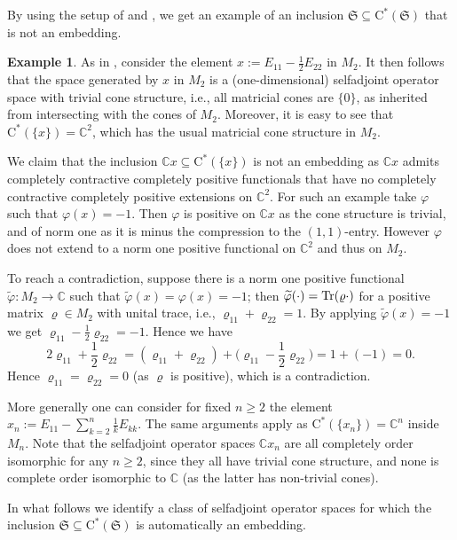 \documentclass[11pt, draft]{amsart}
\numberwithin{equation}{section}
\theoremstyle{plain}
\theoremstyle{definition}
\newtheorem{example}[theorem]{Example}
\theoremstyle{remark}
\newcommand\vphi{\varphi}
\newcommand{\bC}{\mathbb{C}}
\newcommand{\fS}{{\mathfrak{S}}}
\newcommand{\ca}{\mathrm{C}^*}
\newcommand{\wt}{\widetilde}
\begin{document}
By using the setup of \cite[Example 2.14]{KKM23} and \cite[Example 4.1]{Rus23}, we get an example of an inclusion $\fS \subseteq \ca(\fS)$ that is not an embedding.

\begin{example} \label{E:not incl}
As in \cite[Example 2.14]{KKM23}, consider the element $x := E_{11} - \frac{1}{2}E_{22}$ in $M_2$.
It then follows that the space generated by $x$ in $M_2$ is a (one-dimensional) selfadjoint operator space with trivial cone structure, i.e., all matricial cones are $\{0\}$, as inherited from intersecting with the cones of $M_2$.
Moreover, it is easy to see that $\ca(\{x\}) = \bC^2$, which has the usual matricial cone structure in $M_2$.

We claim that the inclusion $\bC x \subseteq \ca(\{x\})$ is not an embedding as $\bC x$ admits completely contractive completely positive functionals that have no completely contractive completely positive extensions on $\bC^2$.
For such an example take $\vphi$ such that $\vphi(x) = -1$.
Then $\vphi$ is positive on $\bC x$ as the cone structure is trivial, and of norm one as it is minus the compression to the $(1,1)$-entry.
However $\vphi$ does not extend to a norm one positive functional on $\bC^2$ and thus on $M_2$.

To reach a contradiction, suppose there is a norm one positive functional $\wt{\vphi} \colon M_2 \to \bC$ such that $\wt{\vphi}(x) = \vphi(x) = -1$; then $\wt{\vphi}(\cdot) = {\rm Tr}(\varrho \cdot)$ for a positive matrix $\varrho \in M_2$ with unital trace, i.e., $\varrho_{11} + \varrho_{22} = 1$.
By applying $\wt{\vphi}(x) = -1$ we get $\varrho_{11} - \frac{1}{2}\varrho_{22} = -1$.
Hence we have
\[
2\varrho_{11} + \frac{1}{2}\varrho_{22} = \left(\varrho_{11} + \varrho_{22}\right) + \bigg(\varrho_{11} - \frac{1}{2}\varrho_{22}\bigg) = 1+(-1)= 0.
\]
Hence $\varrho_{11} = \varrho_{22} = 0$ (as $\varrho$ is positive), which is a contradiction.

More generally one can consider for fixed $n \geq 2$ the element $x_n:= E_{11} - \sum_{k=2}^n \frac{1}{k} E_{kk}$.
The same arguments apply as $\ca(\{x_n\}) = \bC^n$ inside $M_n$.
Note that the selfadjoint operator spaces $\bC x_n$ are all completely order isomorphic for any $n \geq 2$, since they all have trivial cone structure, and none is complete order isomorphic to $\bC$ (as the latter has non-trivial cones).
\end{example}

In what follows we identify a class of selfadjoint operator spaces for which the inclusion $\fS \subseteq \ca(\fS)$ is automatically an embedding. 
\end{document}
